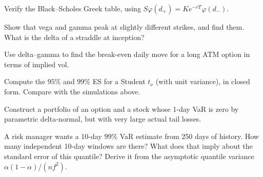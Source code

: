 \begin{exercises}
\item Verify the Black--Scholes Greek table, using $S\varphi(d_+)=Ke^{-rT}\varphi(d_-)$.
\item Show that vega and gamma peak at slightly different strikes, and find them. What is the delta of a straddle at inception?
\item Use delta--gamma to find the break-even daily move for a long ATM option in terms of implied vol.
\item Compute the $95\%$ and $99\%$ ES for a Student $t_\nu$ (with unit variance), in closed form. Compare with the simulations above.
\item Construct a portfolio of an option and a stock whose 1-day VaR is zero by parametric delta-normal, but with very large actual tail losses.
\item A risk manager wants a 10-day $99\%$ VaR estimate from 250 days of history. How many independent 10-day windows are there? What does that imply about the standard error of this quantile? Derive it from the asymptotic quantile variance $\alpha(1-\alpha)/(nf^2)$.
\end{exercises}
